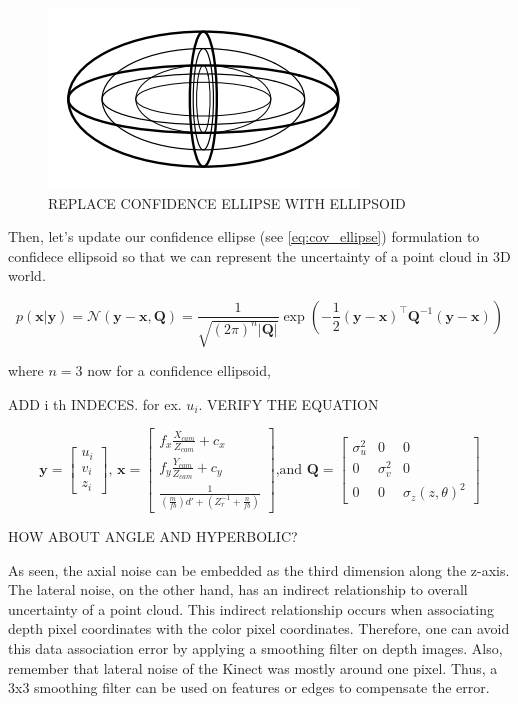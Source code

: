 \documentclass[a4paper]{report}
\numberwithin{figure}{section}
\begin{document}
\begin{figure}[H]
	\centering
  \includegraphics[width=0.3\linewidth,natwidth=640,natheight=640]
  {fig/ref_imgs/ellipsoid.png}
  \caption{REPLACE CONFIDENCE ELLIPSE WITH ELLIPSOID}
	\label{fig:conic_ray_3d_error_model}
\end{figure}

Then, let's update our confidence ellipse (see \ref{eq:cov_ellipse}) formulation 
to confidece ellipsoid so that we can represent the uncertainty of a point cloud 
in 3D world.

\begin{equation}
  p(\mathbf{x}|\mathbf{y}) = \mathcal{N}(\mathbf{y}-\mathbf{x, \mathbf{Q}}) = 
  \frac{1}{\sqrt{(2\pi)^n|\mathbf{Q}|}} 
  \exp(-\frac{1}{2} (\mathbf{y}-\mathbf{x})^\intercal \mathbf{Q}^{-1} (\mathbf{y}-\mathbf{x}))
\end{equation}

where $n=3$ now for a confidence ellipsoid,

ADD i th INDECES. for ex. $u_i$. VERIFY THE EQUATION

\begin{equation}
  \mathbf{y} = \begin{bmatrix} u_i \\ v_i \\ z_i \end{bmatrix} \text{, } 
  \mathbf{x} = 
  \begin{bmatrix} 
    f_x \frac{X_{cam}}{Z_{cam}} + c_x \\ 
    f_y \frac{Y_{cam}}{Z_{cam}} + c_y \\
    \frac{1}{(\frac{m}{fb})d' + (Z_r^{-1} + \frac{n}{fb})}
  \end{bmatrix} \text{,and }
  \mathbf{Q} = 
  \begin{bmatrix} 
    \sigma_u^2 & 0 & 0 \\ 
    0 & \sigma_v^2 & 0 \\
    0 & 0 & \sigma_z(z, \theta)^2
  \end{bmatrix}
\end{equation}

HOW ABOUT ANGLE AND HYPERBOLIC?

As seen, the axial noise can be embedded as the third dimension along the z-axis. 
The lateral noise, on the other hand, has an indirect relationship to overall 
uncertainty of a point cloud. This indirect relationship occurs when associating 
depth pixel coordinates with the color pixel coordinates. Therefore, one can 
avoid this data association error by applying a smoothing filter on depth images. 
Also, remember that lateral noise of the Kinect was mostly around one pixel. 
Thus, a 3x3 smoothing filter can be used on features or edges to compensate the error.
\end{document}
